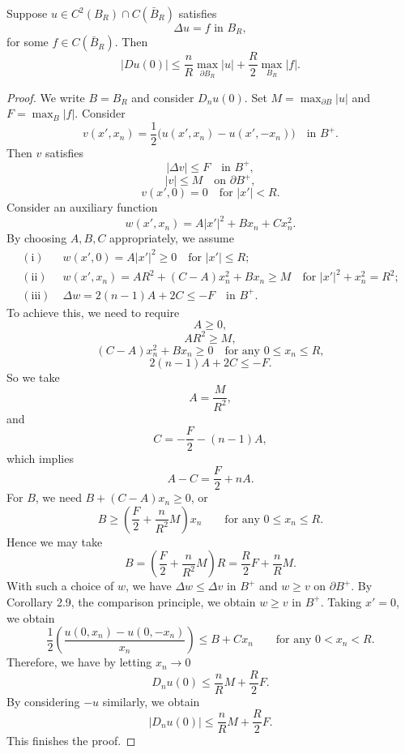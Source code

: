 \begin{lemma}\label{hanlin:poisson-lemma-2-17}
Suppose $u\in C^2(B_R)\cap C(\bar{B}_R)$ satisfies
\[
\Delta u=f \text{ in } B_R,
\]
for some $f\in C(\bar{B}_R)$. Then
\[
|Du(0)|\le \frac{n}{R}\max_{\partial B_R}|u|+\frac{R}{2}\max_{B_R}|f|.
\]
\end{lemma}
\begin{proof}
\sketch
We write $B=B_R$ and consider $D_nu(0)$. Set $M=\max_{\partial B}|u|$ and
$F=\max_B|f|$. Consider
\[
v(x',x_n)=\frac12\bigl(u(x',x_n)-u(x',-x_n)\bigr)\quad\text{in }B^+.
\]
Then $v$ satisfies
\[
|\Delta v|\le F \quad\text{in }B^+,
\]
\[
|v|\le M \quad\text{on }\partial B^+,
\]
\[
v(x',0)=0\quad\text{for }|x'|<R.
\]
Consider an auxiliary function
\[
w(x',x_n)=A|x'|^2+Bx_n+Cx_n^2.
\]
By choosing $A,B,C$ appropriately, we assume
\begin{align*}
(\text{i})\;&w(x',0)=A|x'|^2\ge 0 \quad\text{for }|x'|\le R;\\
(\text{ii})\;&w(x',x_n)=AR^2+(C-A)x_n^2+Bx_n\ge M \quad\text{for }|x'|^2+x_n^2=R^2;\\
(\text{iii})\;&\Delta w=2(n-1)A+2C\le -F \quad\text{in }B^+.
\end{align*}
To achieve this, we need to require
\[
A\ge 0,
\]
\[
AR^2\ge M,
\]
\[
(C-A)x_n^2+Bx_n\ge 0 \quad\text{for any }0\le x_n\le R,
\]
\[
2(n-1)A+2C\le -F.
\]
So we take
\[
A = \frac{M}{R^2},
\]
and
\[
C = -\frac{F}{2} - (n-1)A,
\]
which implies
\[
A - C = \frac{F}{2} + nA.
\]
For $B$, we need $B + (C-A)x_n \ge 0$, or
\[
B \ge \left(\frac{F}{2} + \frac{n}{R^2}M\right)x_n \qquad \text{for any $0 \le x_n \le R$.}
\]
Hence we may take
\[
B = \left(\frac{F}{2} + \frac{n}{R^2}M\right)R = \frac{R}{2}F + \frac{n}{R}M.
\]
With such a choice of $w$, we have $\Delta w \le \Delta v$ in $B^+$ and $w \ge v$ on $\partial B^+$. By Corollary 2.9, the comparison principle, we obtain $w \ge v$ in $B^+$. Taking $x' = 0$, we obtain
\[
\frac{1}{2}\left(\frac{u(0,x_n)-u(0,-x_n)}{x_n}\right) \le B + Cx_n \qquad \text{for any $0 < x_n < R$.}
\]
Therefore, we have by letting $x_n \to 0$
\[
D_n u(0) \le \frac{n}{R}M + \frac{R}{2}F.
\]
By considering $-u$ similarly, we obtain
\[
|D_n u(0)| \le \frac{n}{R}M + \frac{R}{2}F.
\]
This finishes the proof.
\end{proof}

